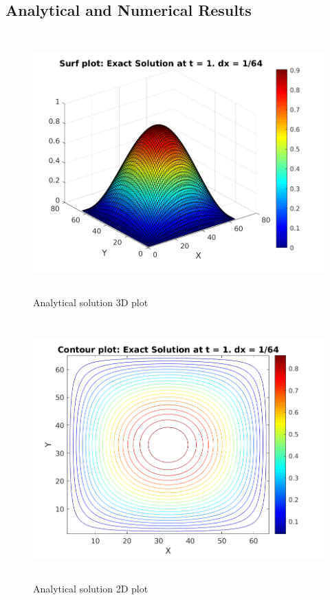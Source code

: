 \documentclass[12pt]{article}
\begin{document}
	\subsection{Analytical and Numerical Results}
	\begin{figure}[H]
		\hfill\includegraphics[width=150mm,height= 100mm]{exactsurf.png}\hspace*{\fill}
		\caption{Analytical solution 3D plot}
	\end{figure}

	\begin{figure}[H]
		\hfill\includegraphics[width=150mm,height= 100mm]{exactcontour.png}\hspace*{\fill}
		\caption{Analytical solution 2D plot}
	\end{figure}
\end{document}
